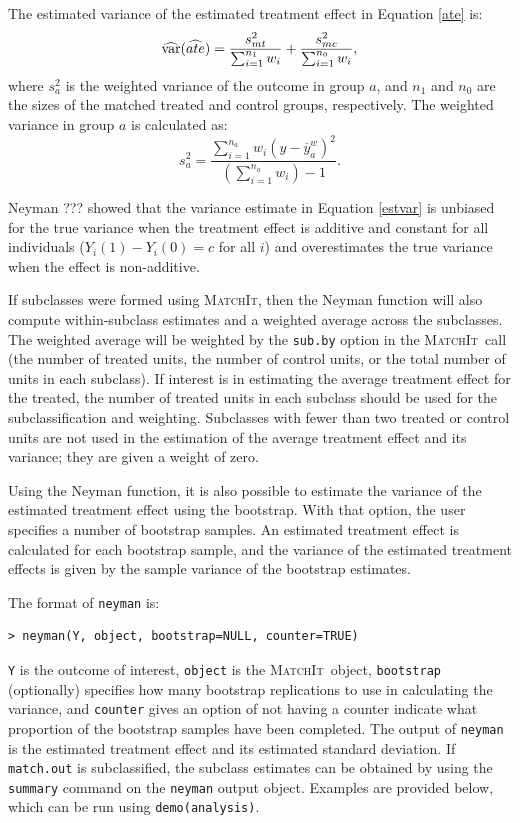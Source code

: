 \documentclass[oneside,letterpaper,titlepage]{article}
\newcommand{\MatchIt}{\textsc{MatchIt}}
\begin{document}
The estimated variance of the estimated treatment effect in Equation
\eqref{ate} is:
\begin{equation}
\label{estvar}
\widehat{{\rm var}}(\widehat{ate}) = \frac{s_{mt}^2}{\sum_{i=1}^{n_1} w_i} + \frac{s_{mc}^2}{\sum_{i=1}^{n_0} w_i},
\end{equation}
where $s_a^2$ is the weighted variance of the outcome in group $a$,
and $n_1$ and $n_0$ are the sizes of the matched treated and control
groups, respectively.  The weighted variance in group $a$ is
calculated as:
$$s^2_{a} = \frac{\sum_{i=1}^{n_a} w_i
  (y-\overline{y}_a^w)^2}{(\sum_{i=1}^{n_a} w_i) - 1}.$$

Neyman ??? showed that the variance estimate in Equation
\eqref{estvar} is unbiased for the true variance when the treatment
effect is additive and constant for all individuals ($Y_i(1)-Y_i(0)=c$
for all $i$) and overestimates the true variance when the effect is
non-additive.

If subclasses were formed using \MatchIt, then the Neyman function
will also compute within-subclass estimates and a weighted average
across the subclasses.  The weighted average will be weighted by the
{\tt sub.by} option in the \MatchIt\ call (the number of treated units,
the number of control units, or the total number of units in each
subclass).  If interest is in estimating the average treatment effect
for the treated, the number of treated units in each subclass should
be used for the subclassification and weighting.  Subclasses with
fewer than two treated or control units are not used in the estimation
of the average treatment effect and its variance; they are given a
weight of zero.

Using the Neyman function, it is also possible to estimate the
variance of the estimated treatment effect using the bootstrap.  With
that option, the user specifies a number of bootstrap samples.  An
estimated treatment effect is calculated for each bootstrap sample,
and the variance of the estimated treatment effects is given by the
sample variance of the bootstrap estimates.  

The format of {\tt neyman} is:

\begin{verbatim}
> neyman(Y, object, bootstrap=NULL, counter=TRUE)
\end{verbatim}

{\tt Y} is the outcome of interest, {\tt object} is the \MatchIt\ 
object, {\tt bootstrap} (optionally) specifies how many bootstrap
replications to use in calculating the variance, and {\tt counter}
gives an option of not having a counter indicate what proportion of
the bootstrap samples have been completed.  The output of {\tt neyman}
is the estimated treatment effect and its estimated standard
deviation.  If {\tt match.out} is subclassified, the subclass
estimates can be obtained by using the {\tt summary} command on the
{\tt neyman} output object.  Examples are provided below, which can be
run using {\tt demo(analysis)}.
\end{document}
